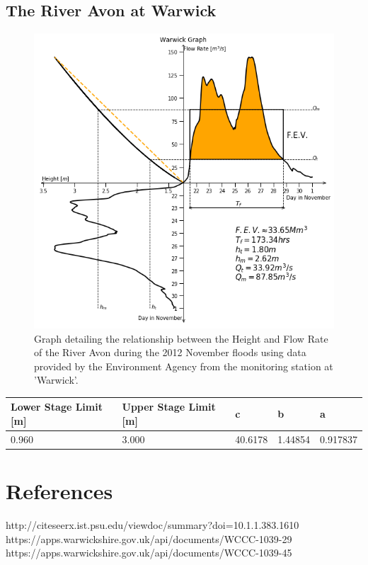 \documentclass[11 pt, a4paper]{article}
\begin{document}
\subsection{The River Avon at Warwick}
\begin{figure}[H]
\begin{center}
\includegraphics[width=.5\linewidth]{Warwick-Quadrant_Graph.png}
\caption{Graph detailing the relationship between the Height and Flow Rate of the River Avon during the 2012 November floods using data provided by the Environment Agency from the monitoring station at 'Warwick'.}
\end{center}
\end{figure}
\begin{center}
\begin{tabular}{|l|l|l|l|l|}
\hline
Lower Stage Limit {[}m{]} & Upper Stage Limit {[}m{]} & c & b & a \\
\hline
0.960 & 3.000 & 40.6178 & 1.44854 & 0.917837 \\
\hline
\end{tabular}
\end{center}

\newpage
\section{References}
\begin{thebibliography}{}
 http://citeseerx.ist.psu.edu/viewdoc/summary?doi=10.1.1.383.1610
 https://apps.warwickshire.gov.uk/api/documents/WCCC-1039-29
 https://apps.warwickshire.gov.uk/api/documents/WCCC-1039-45
\end{thebibliography}

\newpage
\appendix
\end{document}
